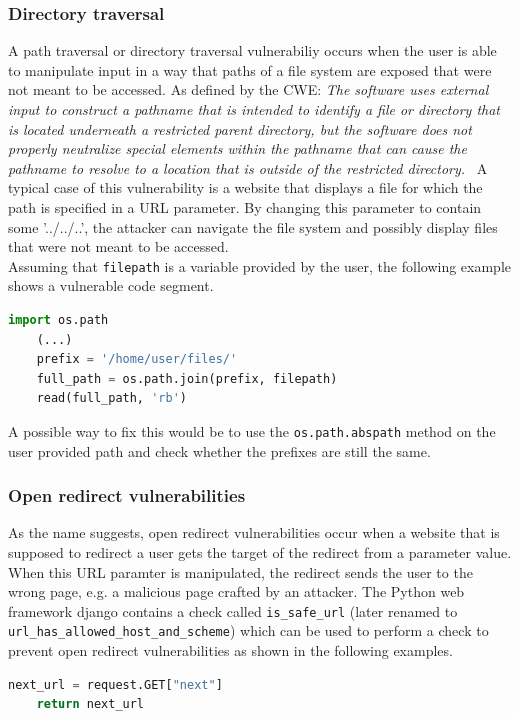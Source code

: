 \documentclass[
a4paper,
pagesize,
pdftex,
12pt,
twoside, %
BCOR=5mm, %
ngerman,
fleqn,
final,
]{scrartcl}
\begin{document}
	\subsubsection{Directory traversal}
	A path traversal or directory traversal vulnerabiliy occurs when the user is able to manipulate input in a way that paths of a file system are exposed that were not meant to be accessed. 
	As defined by the CWE: \textit{The software uses external input to construct a pathname that is intended to identify a file or directory that is located underneath a restricted parent directory, but the software does not properly neutralize special elements within the pathname that can cause the pathname to resolve to a location that is outside of the restricted directory.}~\cite{CommonWeaknessEnumeration.19.9.2019c}  A typical case of this vulnerability is a website that displays a file for which the path is specified in a URL parameter. By changing this parameter to contain some '../../..', the attacker can navigate the file system and possibly display files that were not meant to be accessed.\\
	Assuming that \texttt{filepath} is a variable provided by the user, the following example shows a vulnerable code segment.
	\begin{lstlisting}[language=Python, showstringspaces=False]
	import os.path
	(...)
	prefix = '/home/user/files/'
	full_path = os.path.join(prefix, filepath)
	read(full_path, 'rb')
	\end{lstlisting}
	A possible way to fix this would be to use the \texttt{os.path.abspath} method on the user provided path and check whether the prefixes are still the same. 
	
	
	
	\subsubsection{Open redirect vulnerabilities}
	As the name suggests, open redirect vulnerabilities occur when a website that is supposed to redirect a user gets the target of the redirect from a parameter value. When this URL paramter is manipulated, the redirect sends the user to the wrong page, e.g. a malicious page crafted by an attacker. The Python web framework django contains a check called \texttt{is\_safe\_url} (later renamed to \texttt{url\_has\_allowed\_host\_and\_scheme}) which can be used to perform a check to prevent open redirect vulnerabilities as shown in the following examples.
	
	\begin{lstlisting}[language=Python, showstringspaces=False]
	next_url = request.GET["next"]
	return next_url
	\end{lstlisting}
	
\end{document}
